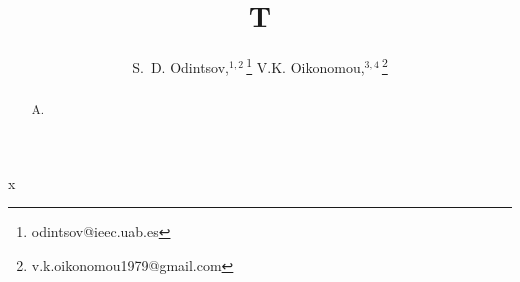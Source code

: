 \documentclass[aps,prd,superscriptaddress]{revtex4}
\begin{document}
\title{T}
\author{S.~D. Odintsov,$^{1,2}$\,\thanks{odintsov@ieec.uab.es}
V.K. Oikonomou,$^{3,4}$\,\thanks{v.k.oikonomou1979@gmail.com}}
\begin{abstract}A.\end{abstract}
\maketitle
x
\end{document}
